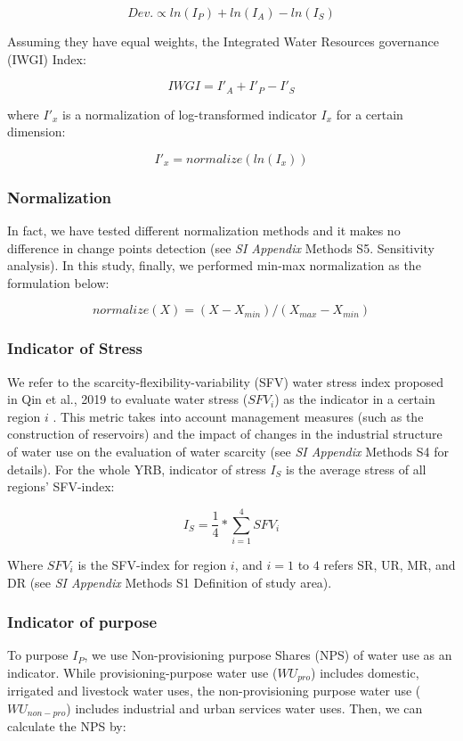 \documentclass[9pt, twocolumn, twoside, lineno]{pnas-new}
\begin{document}
{	$$ Dev. \propto ln(I_P) + ln(I_A) - ln(I_S) $$

	Assuming they have equal weights, the Integrated Water Resources governance (IWGI) Index:

	$$ IWGI = I'_A + I'_P - I'_S $$

	where $I'_x$ is a normalization of log-transformed indicator $I_x$ for a certain dimension:

	$$ I'_x = normalize(ln(I_x)) $$
	
	\subsubsection*{Normalization}
	In fact, we have tested different normalization methods and it makes no difference in change points detection (see \textit{SI Appendix} Methods S5. Sensitivity analysis). In this study, finally, we performed min-max normalization as the formulation below:

	$$ normalize(X) = (X - X_{min}) / (X_{max} - X_{min}) $$

	\subsubsection*{Indicator of Stress}
	We refer to the scarcity-flexibility-variability (SFV) water stress index proposed in Qin et al., 2019 to evaluate water stress ($SFV_i$) as the indicator in a certain region $i$ \cite{qinFlexibilityIntensityGlobal2019}. This metric takes into account management measures (such as the construction of reservoirs) and the impact of changes in the industrial structure of water use on the evaluation of water scarcity (see \textit{SI Appendix} Methods S4 for details). For the whole YRB, indicator of stress $I_S$ is the average stress of all regions' SFV-index: 

	$$ I_S = \frac{1}{4} * \sum_{i=1}^4 SFV_{i} $$
	
	Where $SFV_i$ is the SFV-index for region $i$, and $i=1$ to $4$ refers SR, UR, MR, and DR (see \textit{SI Appendix} Methods S1 Definition of study area).

	\subsubsection*{Indicator of purpose}
	To purpose $I_P$, we use Non-provisioning purpose Shares (NPS) of water use as an indicator. While provisioning-purpose water use ($WU_{pro}$) includes domestic, irrigated and livestock water uses, the non-provisioning purpose water use ($WU_{non-pro}$) includes industrial and urban services water uses. Then, we can calculate the NPS by:

}
\end{document}
